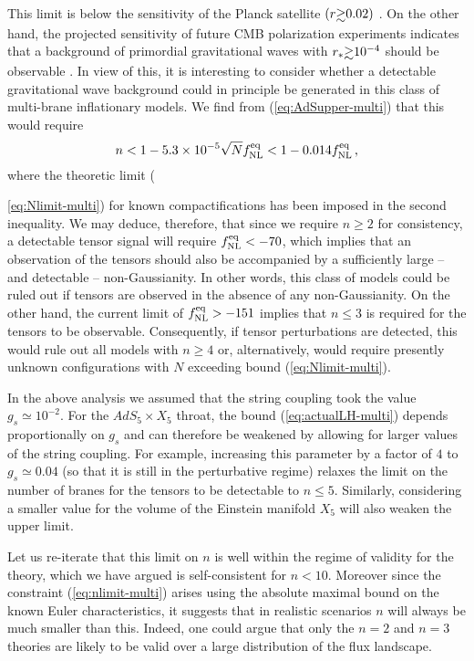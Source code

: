 This limit is below the sensitivity of the Planck satellite 
$(r \gsim 0.02 )$ \cite{planck}. On the other hand, 
the projected sensitivity of future CMB polarization experiments 
indicates that a background of primordial 
gravitational waves with $r_* \gsim 10^{-4}$ 
should be observable \cite{songknox,vpj}. In view of this, 
it is interesting to consider whether
a detectable gravitational wave background could in principle 
be generated in this class of multi-brane inflationary 
models. We find from (\ref{eq:AdSupper-multi}) that this would require 
% 
\begin{equation}
\label{eq:nlimit-multi}
n < 1 -5.3 \times 10^{-5} \sqrt{N} f_{\mathrm{NL}}^{\mathrm{eq}} < 1-0.014 f_{\mathrm{NL}}^{\mathrm{eq}} \,,
\end{equation}
% 
where the theoretic limit ({\ref{eq:Nlimit-multi}) for 
known compactifications has been imposed in the 
second inequality. We may deduce, therefore, that  
since we require $n \ge 2$ for consistency, a detectable tensor 
signal will require $f_{\mathrm{NL}}^{\mathrm{eq}} < -70$, which implies that an observation of 
the tensors should also be 
accompanied by a sufficiently large -- and detectable -- non-Gaussianity. 
In other words, this class of models could  
be ruled out if tensors are observed in the absence of any
non-Gaussianity. On the other hand, the current 
limit of  $f_{\mathrm{NL}}^{\mathrm{eq}} >-151$ implies that $n \le 3$ is required 
for the tensors to be observable. 
Consequently, if tensor perturbations are detected, this would rule 
out all models with $n \ge  4$ or, alternatively, would require presently 
unknown configurations with $N$ exceeding bound (\ref{eq:Nlimit-multi}). 


In the above analysis we assumed that the string coupling 
took the value $g_s \simeq 10^{-2}$. For the $AdS_5 \times X_5$ throat, 
the bound (\ref{eq:actualLH-multi}) depends proportionally on $g_s$ and can 
therefore be weakened by allowing for larger values of the string coupling. 
For example, increasing this parameter by a factor of $4$ 
to $g_s \simeq 0.04$ (so that it is still in the perturbative regime)
relaxes the limit on the number of branes for the tensors to be detectable to 
$n \le 5$. Similarly, considering a smaller value for the 
volume of the Einstein manifold $X_5$ will also weaken the upper limit. 


Let us re-iterate that this limit on $n$ is well within the 
regime of validity for the theory, which we have argued is 
self-consistent for $n<10$. Moreover since the constraint (\ref{eq:nlimit-multi})
arises using the absolute maximal bound on the known 
Euler characteristics, it suggests that in realistic scenarios $n$ will 
always be much smaller than this. Indeed, one could argue that 
only the $n=2$ and $n=3$ theories are
likely to be valid over a large distribution of the flux landscape. 


}
